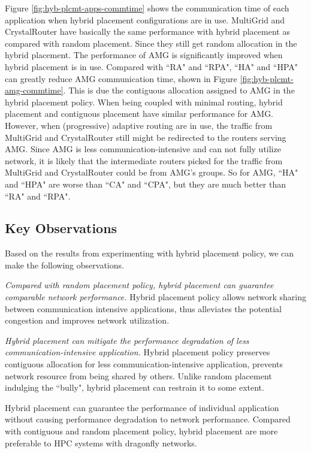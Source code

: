 \documentclass[conference,compsoc]{IEEEtran}
\begin{document}
Figure \ref{fig:hyb-plcmt-apps-commtime} shows the communication time of each application when hybrid placement configurations are in use. MultiGrid and CrystalRouter have basically the same performance with hybrid placement as compared with random placement. Since they still get random allocation in the hybrid placement. The performance of AMG is significantly improved when hybrid placement is in use. Compared with ``RA" and ``RPA", ``HA" and ``HPA" can greatly reduce AMG communication time, shown in Figure \ref{fig:hyb-plcmt-amg-commtime}. This is due the contiguous allocation assigned to AMG in the hybrid placement policy. When being coupled with minimal routing, hybrid placement and contiguous placement have similar performance for AMG. However, when (progressive) adaptive routing are in use, the traffic from MultiGrid and CrystalRouter still might be redirected to the routers serving AMG. Since AMG is less communication-intensive and can not fully utilize network, it is likely that the intermediate routers picked for the traffic from MultiGrid and CrystalRouter could be from AMG's groups. So for AMG, ``HA" and ``HPA" are worse than ``CA" and ``CPA", but they are much better than ``RA" and ``RPA".

\subsection{Key Observations}

Based on the results from experimenting with hybrid placement policy, we can make the following observations.

\emph{Compared with random placement policy, hybrid placement can guarantee comparable network performance.} Hybrid placement policy allows network sharing between communication intensive applications, thus alleviates the potential congestion and improves network utilization.

\emph{Hybrid placement can mitigate the performance degradation of less communication-intensive application.} Hybrid placement policy preserves contiguous allocation for less communication-intensive application, prevents network resource from being shared by others. Unlike random placement indulging the ``bully", hybrid placement can restrain it to some extent.

Hybrid placement can guarantee the performance of individual application without causing performance degradation to network performance. Compared with contiguous and random placement policy, hybrid placement are more preferable to HPC systems with dragonfly networks.
\end{document}
